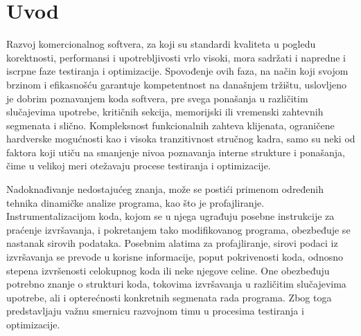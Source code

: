 \documentclass[12pt,oneside]{memoir}
\begin{document}
\frontmatter
\naslovna
\komisija
\apstrakt
\tableofcontents

\mainmatter

\chapter{Uvod}

Razvoj komercionalnog softvera, za koji su standardi kvaliteta u pogledu korektnosti, performansi i upotrebljivosti vrlo visoki, mora sadržati i napredne i iscrpne faze testiranja i optimizacije. Spovođenje ovih faza, na način koji svojom brzinom i efikasnošću garantuje kompetentnost na današnjem tržištu, uslovljeno je dobrim poznavanjem koda softvera, pre svega ponašanja u različitim slučajevima upotrebe, kritičnih sekcija, memorijski ili vremenski zahtevnih segmenata i slično. Kompleksnost funkcionalnih zahteva  klijenata, ograničene hardverske mogućnosti kao i visoka tranzitivnost stručnog kadra, samo su neki od faktora koji utiču na smanjenje nivoa poznavanja interne strukture i ponašanja, čime u velikoj meri otežavaju procese testiranja i optimizacije.

Nadoknađivanje nedostajućeg znanja, može se postići primenom određenih tehnika dinamičke analize programa, kao što je profajliranje. Instrumentalizacijom koda, kojom se u njega ugrađuju posebne instrukcije za praćenje izvršavanja, i pokretanjem tako modifikovanog programa, obezbeđuje se nastanak sirovih podataka. Posebnim alatima za profajliranje, sirovi podaci iz izvršavanja se prevode u korisne informacije, poput pokrivenosti koda, odnosno stepena izvršenosti celokupnog koda ili neke njegove celine. One obezbeđuju potrebno znanje o strukturi koda, tokovima izvršavanja u različitim slučajevima upotrebe, ali i opterećnosti konkretnih segmenata rada programa. Zbog toga predstavljaju važnu smernicu razvojnom timu u procesima testiranja i optimizacije.
\end{document}
